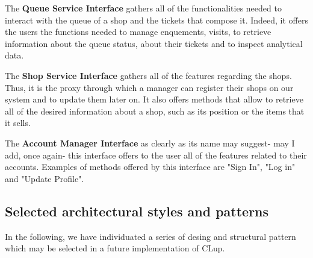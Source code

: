 \FloatBarrier

The \textbf{Queue Service Interface} gathers all of the functionalities needed to interact with the queue of a shop and the tickets that compose it.\newline
Indeed, it offers the users the functions needed to manage enquements, visits, to retrieve information about the queue status, about their tickets and to inspect analytical data.
    
The \textbf{Shop Service Interface} gathers all of the features regarding the shops. Thus, it is the proxy through which a manager can register their shops on our system and to update them later on. It also offers methods that allow to retrieve all of the desired information about a shop, such as its position or the items that it sells.

The \textbf{Account Manager Interface} as clearly as its name may suggest- may I add, once again- this interface offers to the user all of the features related to their accounts. Examples of methods offered by this interface are "Sign In", "Log in" and "Update Profile".

\subsection{Selected architectural styles and patterns}
\label{subsect:selectedarchitecturalstylesandpatterns}

In the following, we have individuated a series of desing and structural pattern which may be selected in a future implementation of CLup.

